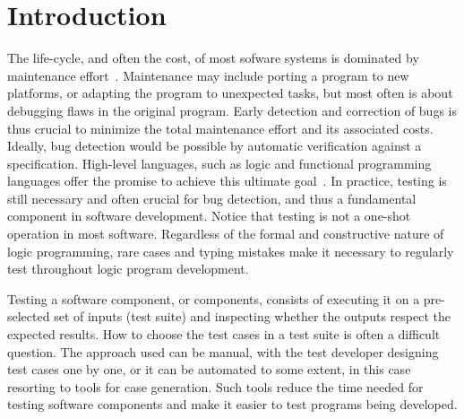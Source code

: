 
\section{Introduction}
\label{sec:intro}


The life-cycle, and often the cost, of most sofware systems is
dominated by maintenance effort~\cite{wasnik2013software,DBLP:journals/tplp/SerebrenikSD08,swi-prolog}.
%
Maintenance may include porting a program to new platforms, or
adapting the program to unexpected tasks, but most often is about
debugging flaws in the original program.
%
Early detection and
correction of bugs is thus crucial to minimize the total maintenance
effort and its associated costs.
%
Ideally, bug detection would be possible by automatic verification
against a specification.
%
High-level languages, such as logic and functional programming languages
offer the promise to achieve this ultimate
goal~\cite{wadler1989theorems,cortesi1997specification}.
%
In practice, testing is still necessary and often crucial for bug
detection, and thus a fundamental component in software development.
%
%
Notice that testing is not a one-shot operation in most software.
%
Regardless of the formal and constructive nature of logic programming,
rare cases and typing mistakes make it necessary to regularly test
throughout logic program development.

Testing a software component, or components, consists of executing it on
a pre-selected set of inputs (test suite) and inspecting whether the outputs
respect the expected results.
%
%
How to choose the test cases in a test suite is often a difficult
question.
%
The approach used
can be  manual, with the test developer designing test cases one by
one, or it can be automated to some extent, in this case resorting to
tools for case generation.
%
Such tools reduce the time needed for testing software components and make
it easier to test programs being developed.


